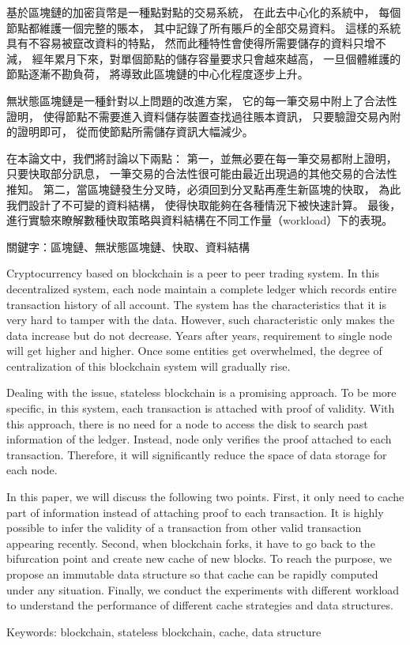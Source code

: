 \begin{abstractzh}
基於區塊鏈的加密貨幣是一種點對點的交易系統，
在此去中心化的系統中，
每個節點都維護一個完整的賬本，
其中記錄了所有賬戶的全部交易資料。
這樣的系統具有不容易被竄改資料的特點，
然而此種特性會使得所需要儲存的資料只增不減，
經年累月下來，對單個節點的儲存容量要求只會越來越高，
一旦個體維護的節點逐漸不勘負荷，
將導致此區塊鏈的中心化程度逐步上升。

無狀態區塊鏈是一種針對以上問題的改進方案，
它的每一筆交易中附上了合法性證明，
使得節點不需要進入資料儲存裝置查找過往賬本資訊，
只要驗證交易內附的證明即可，
從而使節點所需儲存資訊大幅減少。

在本論文中，我們將討論以下兩點：
第一，並無必要在每一筆交易都附上證明，
只要快取部分訊息，
一筆交易的合法性很可能由最近出現過的其他交易的合法性推知。
第二，當區塊鏈發生分叉時，必須回到分叉點再產生新區塊的快取，
為此我們設計了不可變的資料結構，
使得快取能夠在各種情況下被快速計算。
最後，進行實驗來瞭解數種快取策略與資料結構在不同工作量（workload）下的表現。


\bigbreak
\noindent
關鍵字：區塊鏈、無狀態區塊鏈、快取、資料結構
\end{abstractzh}

\begin{abstracten}

Cryptocurrency based on blockchain is a peer to peer trading system. In this decentralized system, each node maintain a complete ledger which records entire transaction history of all account. The system has the characteristics that it is very hard to tamper with the data. However, such characteristic only makes the data increase but do not decrease. Years after years, requirement to single node will get higher and higher. Once some entities get overwhelmed, the degree of centralization of this blockchain system will gradually rise.

Dealing with the issue, stateless blockchain is a promising approach. To be more specific, in this system, each transaction is attached with proof of validity. With this approach, there is no need for a node to access the disk to search past information of the ledger. Instead, node only verifies the proof attached to each transaction. Therefore, it will significantly reduce the space of data storage for each node.

In this paper, we will discuss the following two points.
First, it only need to cache part of information instead of attaching proof to each transaction. It is highly possible to infer the validity of a transaction from other valid transaction appearing recently. Second, when blockchain forks, it have to go back to the bifurcation point and create new cache of new blocks. To reach the purpose, we propose an immutable data structure so that cache can be rapidly computed under any situation. Finally, we conduct the experiments with different workload to understand the performance of different cache strategies and data structures.

\bigbreak
\noindent
Keywords: blockchain, stateless blockchain, cache, data structure
\end{abstracten}

